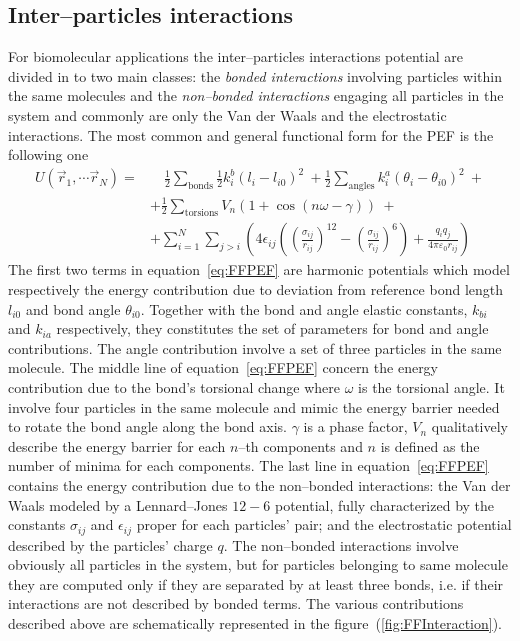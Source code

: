 \subsection{Inter--particles interactions}
For biomolecular applications the inter--particles interactions potential are divided in to two main classes: the \textit{bonded interactions} involving particles within the same molecules and the \textit{non--bonded interactions} engaging all particles in the system and commonly are only the Van der Waals and the electrostatic interactions. The most  common and general functional form for the \ac{PEF} is the following one
\begin{equation}
	\begin{aligned}
		U(\vec r_1, \cdots \vec r_N) = &\quad \frac{1}{2}\sum_{\text{bonds}} \frac{1}{2}k_i^b(l_i - l_{i0})^2\ + \frac{1}{2}\sum_{\text{angles}} k_i^a (\theta_i - \theta_{i0})^2\ +\\
		&+ \frac{1}{2}\sum_{\text{torsions}} V_n(1+\cos (n\omega - \gamma))\ + \\
		&+ \sum_{i=1}^N \sum_{j>i} \left ( {4\epsilon_{ij} \left ( \left ( \frac{\sigma_{ij}}{r_{ij}} \right )^{12} - \left ( \frac{\sigma_{ij}}{r_{ij}} \right )^6 \right )  + \frac{q_iq_j}{4\pi\varepsilon_0 r_{ij}}} \right )
	\end{aligned}
	\label{eq:FFPEF}
\end{equation}
The first two terms in equation~\eqref{eq:FFPEF} are harmonic potentials which model respectively the energy contribution due to deviation from reference bond length $l_{i0}$ and bond angle $\theta_{i0}$. Together with the bond and angle elastic constants, $k_{bi}$ and $k_{ia}$ respectively, they constitutes the set of parameters for bond and angle contributions. The angle contribution involve a set of three particles in the same molecule.  The middle line of equation~\eqref{eq:FFPEF} concern the energy contribution due to the bond's torsional change where $\omega$ is the
torsional angle. It involve four particles in the same molecule and mimic the energy barrier needed to rotate the bond angle along the bond axis. $\gamma$ is a phase factor, $V_n$ qualitatively describe the energy barrier for each $n$--th components and $n$ is defined as the number of minima for each components. The last line in equation~\eqref{eq:FFPEF} contains the energy contribution due to the non--bonded interactions: the Van der Waals modeled by a Lennard--Jones $12-6$ potential, fully characterized by the constants $\sigma_{ij}$ and $\epsilon_{ij}$ proper for each particles' pair; and the electrostatic potential described by the particles' charge $q$. The non--bonded interactions involve obviously all particles in the system, but for particles belonging to same molecule they are computed only if they  are separated by at least three bonds, i.e. if their interactions are not described by bonded terms. The various contributions described above are schematically represented in the figure~(\ref{fig:FFInteraction}).

